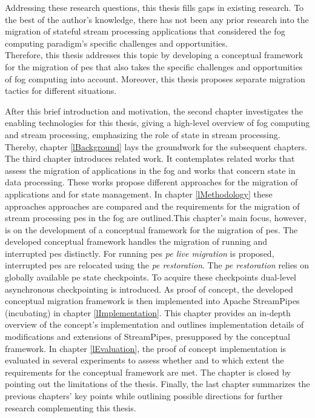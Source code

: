 Addressing these research questions, this thesis fills gaps in existing research. To the best of the author's knowledge, there has not been any prior research into the migration of stateful stream processing applications that considered the fog computing paradigm's specific challenges and opportunities.\\
Therefore, this thesis addresses this topic by developing a conceptual framework for the migration of \gls{pe}s that also takes the specific challenges and opportunities of fog computing into account. Moreover, this thesis proposes separate migration tactics for different situations.\par

After this brief introduction and motivation, the second chapter investigates the enabling technologies for this thesis, giving a high-level overview of fog computing and stream processing, emphasizing the role of state in stream processing. Thereby, chapter \ref{lBackground} lays the groundwork for the subsequent chapters. The third chapter introduces related work. It contemplates related works that assess the migration of applications in the fog and works that concern state in data processing. These works propose different approaches for the migration of applications and for state management. In chapter \ref{lMethodology} these approaches approaches are compared and the requirements for the migration of stream processing \gls{pe}s in the fog are outlined.This chapter's main focus, however, is on the development of a conceptual framework for the migration of \gls{pe}s. The developed conceptual framework handles the migration of running and interrupted \gls{pe}s distinctly. For running \gls{pe}s \textit{\acrshort{pe} live migration} is proposed, interrupted \gls{pe}s are relocated using the \textit{\acrshort{pe} restoration}. The \textit{\acrshort{pe} restoration} relies on globally available \gls{pe} state checkpoints. To acquire these checkpoints dual-level asynchronous checkpointing is introduced. As proof of concept, the developed conceptual migration framework is then implemented into Apache StreamPipes (incubating) in chapter \ref{lImplementation}. This chapter provides an in-depth overview of the concept's implementation and outlines implementation details of modifications and extensions of StreamPipes, presupposed by the conceptual framework. In chapter \ref{lEvaluation}, the proof of concept implementation is evaluated in several experiments to assess whether and to which extent the requirements for the conceptual framework are met. The chapter is closed by pointing out the limitations of the thesis. Finally, the last chapter summarizes the previous chapters' key points while outlining possible directions for further research complementing this thesis.